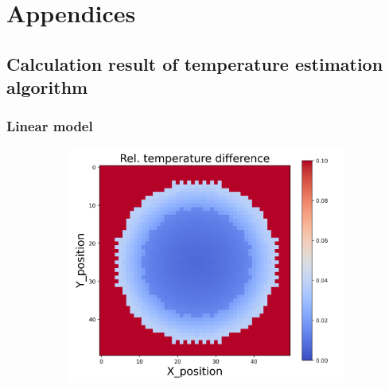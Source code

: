 \chapter{Appendices}%
\section{Calculation result of temperature estimation algorithm}

\subsection{Linear model}
\begin{figure}[h]
    \centering
    \begin{minipage}{\textwidth}
        \centering
        \begin{subfigure}{0.3\textwidth}
            \centering
            \includegraphics[width=\textwidth]{figures/raw_data/0/linear/T_bias.jpg}
        \end{subfigure}
        \begin{subfigure}{0.3\textwidth}
            \centering

\end{subfigure}
\end{minipage}
\end{figure}
